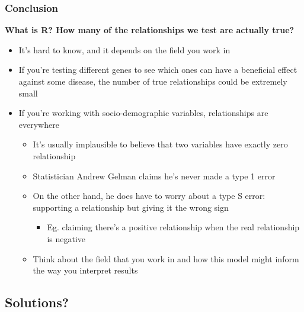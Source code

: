 \documentclass[10pt, block=fill]{beamer}
\begin{document}
\begin{frame}
    \frametitle{Conclusion}
    
    \textbf{What is R? How many of the relationships we test are actually true?}
    \begin{itemize}
        \item It's hard to know, and it depends on the field you work in
        \item If you're testing different genes to see which ones can have a beneficial effect against some disease, the number of true relationships could be extremely small
        \item If you're working with socio-demographic variables, relationships are everywhere
        \begin{itemize}
            \item It's usually implausible to believe that two variables have exactly zero relationship
            \item Statistician Andrew Gelman claims he's never made a type 1 error
            \item On the other hand, he does have to worry about a type S error: supporting a relationship but giving it the wrong sign
            \begin{itemize}
                \item Eg. claiming there's a positive relationship when the real relationship is negative
            \end{itemize}
            \item Think about the field that you work in and how this model might inform the way you interpret results
        \end{itemize}
    \end{itemize}
\end{frame}


\subsection{Solutions?}
\end{document}
